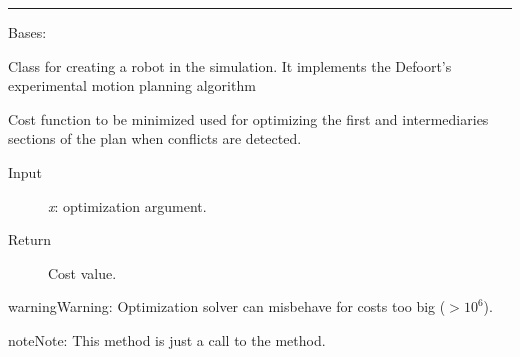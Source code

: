 \documentclass[letterpaper,10pt,english]{sphinxmanual}
\begin{document}
\begin{DUlineblock}{0em}
\item[] 
\end{DUlineblock}


\bigskip\hrule{}\bigskip


\begin{fulllineitems}
\label{Multi-robot motion planner:planning_sim.Robot}
Bases: \href{http://docs.python.org/library/functions.html\#object}{}

Class for creating a robot in the simulation.
It implements the Defoort's experimental motion planning algorithm

\begin{fulllineitems}
\label{Multi-robot motion planner:planning_sim.Robot._co_criterion}
Cost function to be minimized used for optimizing
the first and intermediaries sections of the plan when conflicts are detected.
\begin{description}
\item[{Input}] \leavevmode
\emph{x}: optimization argument.

\item[{Return}] \leavevmode
Cost value.

\end{description}

\begin{notice}{warning}{Warning:}
Optimization solver can misbehave for costs too big (\(> 10^{6}\)).
\end{notice}

\begin{notice}{note}{Note:}
This method is just a call to the {\hyperref[Multi-robot motion planner:planning_sim.Robot._sa_criterion]{}} method.
\end{notice}

\end{fulllineitems}


\end{fulllineitems}
\end{document}
